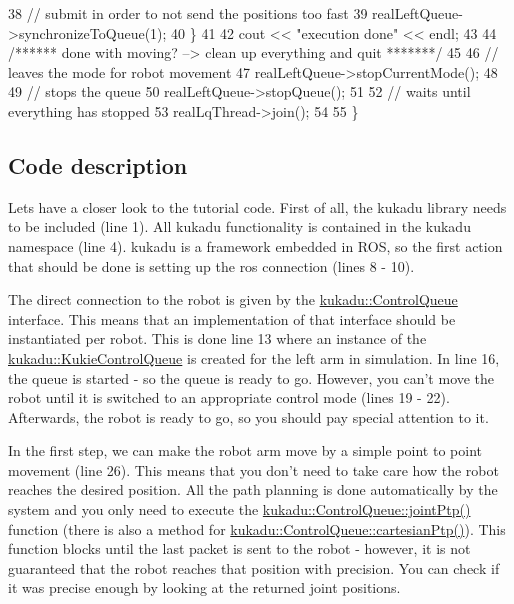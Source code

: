 \begin{DoxyCodeInclude}
38         \textcolor{comment}{// submit in order to not send the positions too fast}
39         realLeftQueue->synchronizeToQueue(1);
40     \}
41 
42     cout << \textcolor{stringliteral}{"execution done"} << endl;
43 
44     \textcolor{comment}{/****** done with moving? --> clean up everything and quit *******/}
45 
46     \textcolor{comment}{// leaves the mode for robot movement}
47     realLeftQueue->stopCurrentMode();
48 
49     \textcolor{comment}{// stops the queue}
50     realLeftQueue->stopQueue();
51 
52     \textcolor{comment}{// waits until everything has stopped}
53     realLqThread->join();
54 
55 \}
\end{DoxyCodeInclude}


\subsection*{Code description}

Lets have a closer look to the tutorial code. First of all, the kukadu library needs to be included (line 1). All kukadu functionality is contained in the kukadu namespace (line 4). kukadu is a framework embedded in R\-O\-S, so the first action that should be done is setting up the ros connection (lines 8 -\/ 10).

The direct connection to the robot is given by the \hyperlink{classkukadu_1_1ControlQueue}{kukadu\-::\-Control\-Queue} interface. This means that an implementation of that interface should be instantiated per robot. This is done line 13 where an instance of the \hyperlink{classkukadu_1_1KukieControlQueue}{kukadu\-::\-Kukie\-Control\-Queue} is created for the left arm in simulation. In line 16, the queue is started -\/ so the queue is ready to go. However, you can't move the robot until it is switched to an appropriate control mode (lines 19 -\/ 22). Afterwards, the robot is ready to go, so you should pay special attention to it.

In the first step, we can make the robot arm move by a simple point to point movement (line 26). This means that you don't need to take care how the robot reaches the desired position. All the path planning is done automatically by the system and you only need to execute the \hyperlink{classkukadu_1_1ControlQueue_ad11059100321b24a1af8ef7de8314353}{kukadu\-::\-Control\-Queue\-::joint\-Ptp()} function (there is also a method for \hyperlink{classkukadu_1_1ControlQueue_a1bfa23a8ce6319f6ef0ed9208e896054}{kukadu\-::\-Control\-Queue\-::cartesian\-Ptp()}). This function blocks until the last packet is sent to the robot -\/ however, it is not guaranteed that the robot reaches that position with precision. You can check if it was precise enough by looking at the returned joint positions.

